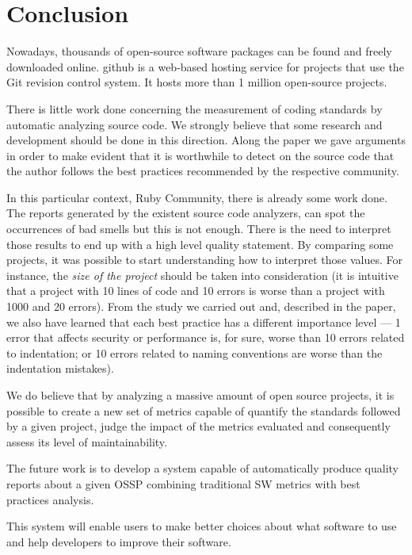 \thispagestyle{empty}
\chapter{Conclusion}\label{chap:conclusion}


Nowadays, thousands of open-source software packages can be found and freely downloaded online.
github is a web-based hosting service for projects that use the Git revision control system.
It hosts more than 1 million open-source projects.

There is little work done concerning the measurement of coding standards by automatic analyzing source code.
We strongly believe that some research and development should be done in this direction.
Along the paper we gave arguments in order to make evident that it is worthwhile to detect on the source code
that the author follows the best practices recommended by the respective community.

In this particular context, Ruby Community, there is already some work done.
The  reports generated by the existent source code analyzers,
can spot the occurrences of bad smells but this is not enough.
There is the need to interpret those results to end up with a high level quality statement.
By comparing some projects, it was possible to start understanding how to interpret those values.
For instance, the \emph{size of the project} should be taken into consideration
(it is intuitive that a project with 10 lines of code and 10 errors is worse than a project with 1000 and 20 errors).
From the study we carried out and, described in the paper,
we also have learned that each best practice has a different importance level
--- 1 error that  affects security or performance is, for sure, worse than 10 errors related to indentation;
or 10 errors related to naming conventions are worse than the indentation mistakes).

We do believe that by analyzing a massive amount of open source projects,
it is possible to create a new set of metrics capable of quantify the standards followed by a given project,
judge the impact of the metrics evaluated
and consequently assess its level of maintainability.

The future work is to develop a system capable of automatically produce quality reports about a given OSSP
combining traditional SW metrics with best practices analysis.

This system will enable users to make better choices about what software to use and help developers to improve their software.

